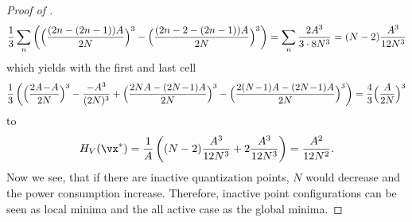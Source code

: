 \begin{proof}[Proof of ]
  \begin{align}
     \frac{1}{3}\sum_n \left( \Big(\frac{(2n - (2n-1))A }{2N}\Big)^3-\Big(\frac{(2n-2-(2n-1))A}{2N}\Big)^3\right)
     = \sum_n \frac{2 A^3}{3 \cdot 8 N^3} = (N-2)\frac{A^3}{12 N^3} \notag
  \end{align}
  which yields with the first and last cell
  \begin{align}
    \frac{1}{3}\left(\Big( \frac{2A\!-\!A}{2N}\Big)^3- \frac{-A^3}{(2N)^3} +
    \Big(\frac{2N A- (2N\!-\!1)A}{2N}\Big)^3 - \Big(\frac{2(N\!-\!1)A-(2N\!-\!1)A}{2N}\Big)^3\right)
    = \frac{4}{3} \Big(\frac{A}{2N}\Big)^3\notag
  \end{align}
  to
  \begin{align}
     H_V(\vx^{*})= \frac{1}{A} \left( (N-2) \frac{A^3}{12 N^3} + 2 \frac{A^3}{12 N^3}\right)= \frac{A^2}{12N^2}.
  \end{align}
  Now we see, that if there are inactive quantization points, $N$ would decrease and the power consumption increase. Therefore, inactive
  point configurations can be seen as local minima and the all active case as the global minima.  
\end{proof}
